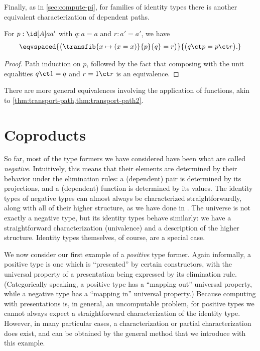 Finally, as in \cref{sec:compute-pi}, for families of identity types there is another equivalent characterization of dependent paths.

\begin{thm}\label{thm:dpath-path}
  For $p:\id[A]a{a'}$ with $q:a=a$ and $r:a'=a'$, we have
  \[ \eqvspaced{ \big(\transfib{x\mapsto (x=x)}{p}{q} = r \big) }{ \big( q \ct p = p \ct r \big). } \]
\end{thm}
\begin{proof}
  Path induction on $p$, followed by the fact that composing with the unit equalities $q\ct 1 = q$ and $r = 1\ct r$ is an equivalence.
\end{proof}

There are more general equivalences involving the application of functions, akin to \cref{thm:transport-path,thm:transport-path2}.

%

\section{Coproducts}
\label{sec:compute-coprod}

%
%
So far, most of the type formers we have considered have been what are called \emph{negative}.
%
%
Intuitively, this means that their elements are determined by their behavior under the elimination rules: a (dependent) pair is determined by its projections, and a (dependent) function is determined by its values.
The identity types of negative types can almost always be characterized straightforwardly, along with all of their higher structure, as we have done in .
The universe is not exactly a negative type, but its identity types behave similarly: we have a straightforward characterization (univalence) and a description of the higher structure.
Identity types themselves, of course, are a special case.

We now consider our first example of a \emph{positive} type former.
%
Again informally, a positive type is one which is ``presented'' by certain constructors, with the universal property of a presentation being expressed by its elimination rule.
(Categorically speaking, a positive type has a ``mapping out'' universal property, while a negative type has a ``mapping in'' universal property.)
Because computing with presentations is, in general, an uncomputable problem, for positive types we cannot always expect a straightforward characterization of the identity type.
However, in many particular cases, a characterization or partial characterization does exist, and can be obtained by the general method that we introduce with this example.

